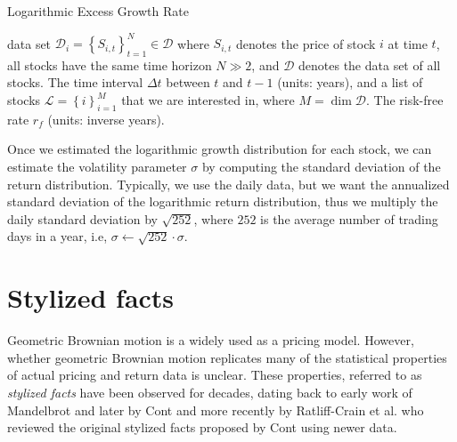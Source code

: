 \documentclass[11pt]{article}
\theoremstyle{definition}
\begin{document}
\begin{algorithm}[h]
    \caption{Logarithmic Excess Growth Rate}\label{algo-log-return-distributions-equity}
    \begin{algorithmic}[1]

        \Statex
        \Require data set $\mathcal{D}_{i} = \left\{S_{i,t}\right\}_{t=1}^{N}\in\mathcal{D}$ where $S_{i,t}$ denotes the price of stock $i$ at time $t$, all stocks have the same time horizon $N\gg{2}$, 
		and $\mathcal{D}$ denotes the data set of all stocks.
        \Require The time interval $\Delta{t}$ between $t$ and $t-1$ (units: years), and a list of stocks $\mathcal{L} = \left\{i\right\}_{i=1}^{M}$ that we are interested in, where $M = \dim\mathcal{D}$.
        \Require The risk-free rate $r_{f}$ (units: inverse years).
     
        \Statex
            \EndFor
        \EndFor
        \Statex
		\EndProcedure
    \end{algorithmic}
\end{algorithm}
Once we estimated the logarithmic growth distribution for each stock, we can estimate the volatility parameter $\sigma$ by computing the standard deviation of the return distribution.
Typically, we use the daily data, but we want the annualized standard deviation of the logarithmic return distribution, thus we multiply the daily standard deviation by $\sqrt{252}$, where $252$ is the average number of trading days in a year, 
i.e, $\sigma\leftarrow \sqrt{252}\cdot\sigma$.

\section*{Stylized facts}
Geometric Brownian motion is a widely used as a pricing model. 
However, whether geometric Brownian motion replicates many of the statistical properties of actual pricing and return data is unclear. 
These properties, referred to as \textit{stylized facts} have been observed for decades, 
dating back to early work of Mandelbrot \cite{Mandelbrot-1963,Mandelbrot-1967} and later by Cont \cite{Cont-QuantFinance-2001} 
and more recently by Ratliff-Crain et al. \cite{ratliffcrain2023revisiting} who reviewed the original stylized facts 
proposed by Cont using newer data.
\end{document}
